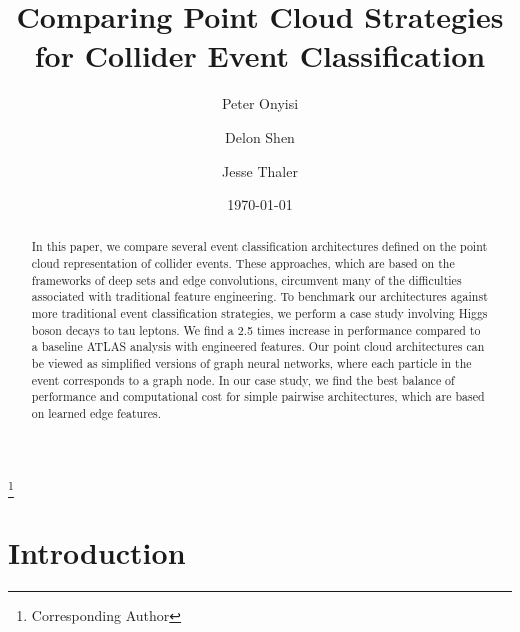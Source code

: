 \documentclass[aps,prd,twocolumn,superscriptaddress,floatfix,longbibliography,preprintnumbers,nofootinbib]{revtex4-1} %
\newcommand{\mytitle}{Comparing Point Cloud Strategies for Collider Event Classification}
\begin{document}
\title{\mytitle}
\author{Peter Onyisi}%
%

\author{Delon Shen}


\thanks{Corresponding Author}
%

\author{Jesse Thaler}
%
%


\date{\today}

\begin{abstract}
%
In this paper, we compare several event classification architectures defined on the point cloud representation of collider events.
%
These approaches, which are based on the frameworks of deep sets and edge convolutions, circumvent many of the difficulties associated with traditional feature engineering.
%
To benchmark our architectures against more traditional event classification strategies, we perform a case study involving Higgs boson decays to tau leptons.
%
We find a 2.5 times increase in performance compared to a baseline ATLAS analysis with engineered features.
%
Our point cloud architectures can be viewed as simplified versions of graph neural networks, where each particle in the event corresponds to a graph node.
%
In our case study, we find the best balance of performance and computational cost for simple pairwise architectures, which are based on learned edge features.
%
\end{abstract}

\maketitle


\tableofcontents

\section{Introduction}
\end{document}
